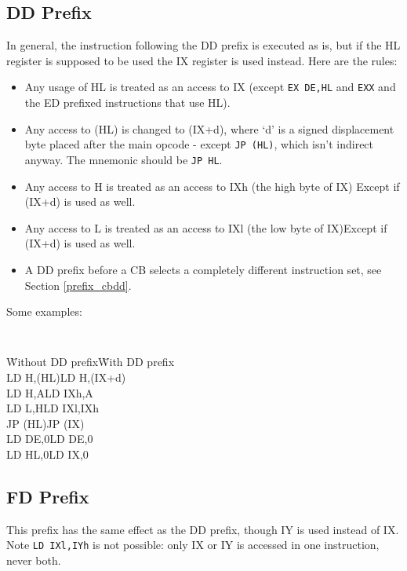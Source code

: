 \documentclass[twoside,openright,a4paper]{book}
\begin{document}
\subsection{DD Prefix \cite{gerton}}

In general, the instruction following the DD prefix is executed as is, but if the HL register is supposed to be used the IX register is used instead. Here are the rules:

\begin{itemize}
	\item Any usage of HL is treated as an access to IX (except {\tt EX DE,HL} and {\tt EXX} and the ED prefixed instructions that use HL).
	
	\item Any access to (HL) is changed to (IX+d), where `d' is a signed displacement byte placed after the main opcode - except {\tt JP (HL)}, which isn't indirect anyway. The mnemonic should be {\tt JP HL}.
	
	\item Any access to H is treated as an access to IXh (the high byte of IX)
	Except if (IX+d) is used as well.
	
	\item Any access to L is treated as an access to IXl (the low byte of IX)Except if (IX+d) is used as well.
	
	\item A DD prefix before a CB selects a completely different instruction set, see Section {\ref{prefix_cbdd}}.
\end{itemize}

Some examples:

{\tt 
	\begin{tabbing}
		{\qquad}\={\rm Without DD prefix}\qquad\={\rm With DD prefix}\+ \\
		LD H,(HL)\>LD H,(IX+d)\\
		LD H,A\>LD IXh,A\\
		LD L,H\>LD IXl,IXh\\
		JP (HL)\>JP (IX)\\
		LD DE,0\>LD DE,0\\
		LD HL,0\>LD IX,0\\
	\end{tabbing}
}


\subsection{FD Prefix \cite{gerton}}

This prefix has the same effect as the DD prefix, though IY is used instead of IX.  Note {\tt LD IXl,IYh} is not possible: only IX or IY is accessed in one instruction, never both.
\end{document}
